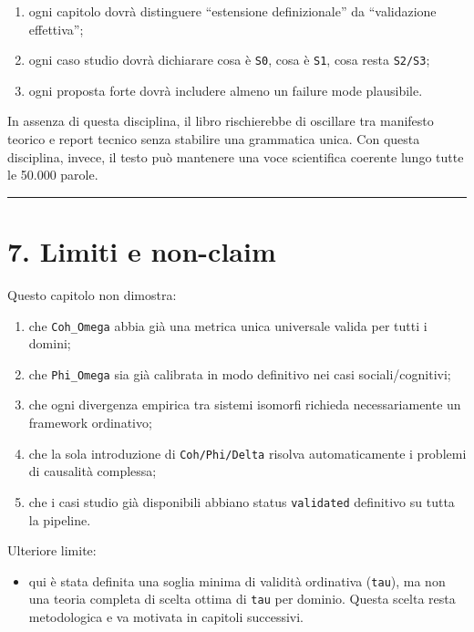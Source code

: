 \begin{enumerate}
\def\labelenumi{\arabic{enumi}.}
\tightlist
\item
  ogni capitolo dovrà distinguere ``estensione definizionale'' da ``validazione effettiva'';
\item
  ogni caso studio dovrà dichiarare cosa è \texttt{S0}, cosa è \texttt{S1}, cosa resta \texttt{S2/S3};
\item
  ogni proposta forte dovrà includere almeno un failure mode plausibile.
\end{enumerate}

In assenza di questa disciplina, il libro rischierebbe di oscillare tra manifesto teorico e report tecnico senza stabilire una grammatica unica. Con questa disciplina, invece, il testo può mantenere una voce scientifica coerente lungo tutte le 50.000 parole.

\begin{center}\rule{0.5\linewidth}{0.5pt}\end{center}

\section{7. Limiti e non-claim}

Questo capitolo non dimostra:

\begin{enumerate}
\def\labelenumi{\arabic{enumi}.}
\tightlist
\item
  che \texttt{Coh\_Omega} abbia già una metrica unica universale valida per tutti i domini;
\item
  che \texttt{Phi\_Omega} sia già calibrata in modo definitivo nei casi sociali/cognitivi;
\item
  che ogni divergenza empirica tra sistemi isomorfi richieda necessariamente un framework ordinativo;
\item
  che la sola introduzione di \texttt{Coh/Phi/Delta} risolva automaticamente i problemi di causalità complessa;
\item
  che i casi studio già disponibili abbiano status \texttt{validated} definitivo su tutta la pipeline.
\end{enumerate}

Ulteriore limite:

\begin{itemize}
\tightlist
\item
  qui è stata definita una soglia minima di validità ordinativa (\texttt{tau}), ma non una teoria completa di scelta ottima di \texttt{tau} per dominio. Questa scelta resta metodologica e va motivata in capitoli successivi.
\end{itemize}

